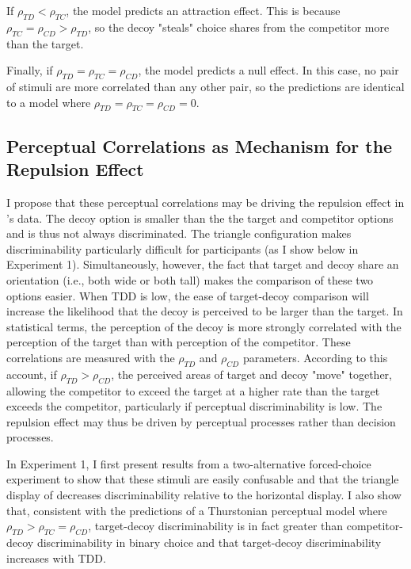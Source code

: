 If $\rho_{TD}<\rho_{TC}$, the model predicts an attraction effect. This is because $\rho_{TC}=\rho_{CD}>\rho_{TD}$, so the decoy "steals" choice shares from the competitor more than the target.

Finally, if $\rho_{TD}=\rho_{TC}=\rho_{CD}$, the model predicts a null effect. In this case, no pair of stimuli are more correlated than any other pair, so the predictions are identical to a model where $\rho_{TD}=\rho_{TC}=\rho_{CD}=0$.

\subsection{Perceptual Correlations as Mechanism for the Repulsion Effect}
I propose that these perceptual correlations may be driving the repulsion effect in \textcite{spektorWhenGoodLooks2018b}'s data. The decoy option is smaller than the the target and competitor options and is thus not always discriminated. The triangle configuration makes discriminability particularly difficult for participants (as I show below in Experiment 1). Simultaneously, however, the fact that target and decoy share an orientation (i.e., both wide or both tall) makes the comparison of these two options easier. When TDD is low, the ease of target-decoy comparison will increase the likelihood that the decoy is perceived to be larger than the target. In statistical terms, the perception of the decoy is more strongly correlated with the perception of the target than with perception of the competitor. These correlations are measured with the $\rho_{TD}$ and $\rho_{CD}$ parameters. According to this account, if $\rho_{TD}>\rho_{CD}$, the perceived areas of target and decoy "move" together, allowing the competitor to exceed the target at a higher rate than the target exceeds the competitor, particularly if perceptual discriminability is low. The repulsion effect may thus be driven by perceptual processes rather than decision processes. 

In Experiment 1, I first present results from a two-alternative forced-choice experiment to show that these stimuli are easily confusable and that the triangle display of \textcite{spektorWhenGoodLooks2018b} decreases discriminability relative to the horizontal display. I also show that, consistent with the predictions of a Thurstonian perceptual model where $\rho_{TD}>\rho_{TC}=\rho_{CD}$, target-decoy discriminability is in fact greater than competitor-decoy discriminability in binary choice and that target-decoy discriminability increases with TDD. 

